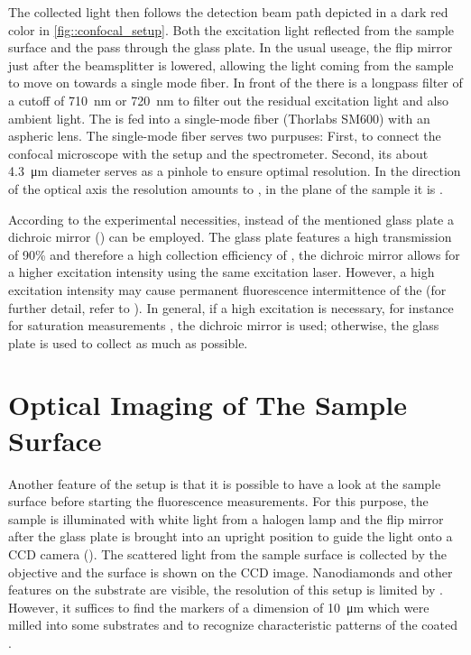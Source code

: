 		The collected light then follows the detection beam path depicted in a dark red color in \autoref{fig::confocal_setup}.
		Both the excitation light reflected from the sample surface and the \fl pass through the glass plate.
		In the usual useage, the flip mirror just after the beamsplitter is lowered, allowing the light coming from the sample to move on towards a single mode fiber. 
		In front of the \smf there is a longpass filter of a cutoff \wl of \SI{710}{\nm} or \SI{720}{\nm} to filter out the residual excitation light and also ambient light.
		The \fl is fed into a single-mode fiber (Thorlabs SM600) with an aspheric lens.
		The single-mode fiber serves two purpuses: First, to connect the confocal microscope with the \hbt setup and the spectrometer.
		Second, its about \SI{4.3}{\micro\meter} diameter serves as a pinhole to ensure optimal resolution. 
		In the direction of the optical axis the resolution amounts to , in the plane of the sample it is .

		According to the experimental necessities, instead of the mentioned glass plate a dichroic mirror () can be employed.
		The glass plate features a high transmission of 90\%  and therefore a high collection efficiency of \fl, the dichroic mirror allows for a higher excitation intensity using the same excitation laser. 
		However, a high excitation intensity may cause permanent fluorescence intermittence of the \sivs (for further detail, refer to ).
		In general, if a high excitation is necessary, for instance for saturation measurements , the dichroic mirror is used; otherwise, the glass plate is used to collect as much \fl as possible.

	\section[Sample Surface]{Optical Imaging of The Sample Surface}

		Another feature of the setup is that it is possible to have a look at the sample surface before starting the fluorescence measurements.
		For this purpose, the sample is illuminated with white light from a halogen lamp and the flip mirror after the glass plate is brought into an upright position to guide the light onto a CCD camera ().
		The scattered light from the sample surface is collected by the objective and the surface is shown on the CCD image.
		Nanodiamonds and other features on the substrate are visible, the resolution of this setup is limited by .
		However, it suffices to find the markers of a dimension of \SI{10}{\micro\meter} which were milled into some substrates and to recognize characteristic patterns of the coated \nds.

